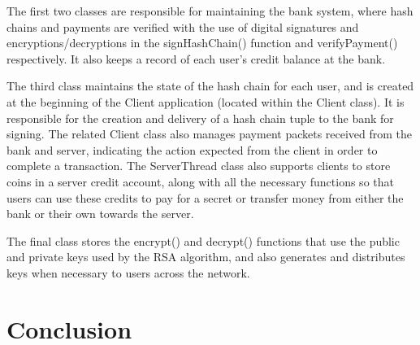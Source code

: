 \documentclass[a4paper,11pt]{article}
\begin{document}
The first two classes are responsible for maintaining the bank system, where 
hash chains and payments are verified with the use of digital signatures and 
encryptions/decryptions in the signHashChain() function and verifyPayment() 
respectively. It also keeps a record of each user’s credit balance at the bank.

The third class maintains the state of the hash chain for each user, and is 
created at the beginning of the Client application (located within the Client 
class). It is responsible for the creation and delivery of a hash chain tuple to
the bank for signing. The related Client class also manages payment packets 
received from the bank and server, indicating the action expected from the 
client in order to complete a transaction. The ServerThread class also supports 
clients to store coins in a server credit account, along with all the necessary 
functions so that users can use these credits to pay for a secret or transfer 
money from either the bank or their own towards the server.

The final class stores the encrypt() and decrypt() functions that use the public
and private keys used by the RSA algorithm, and also generates and distributes 
keys when necessary to users across the network.

\section{Conclusion}
\end{document}
